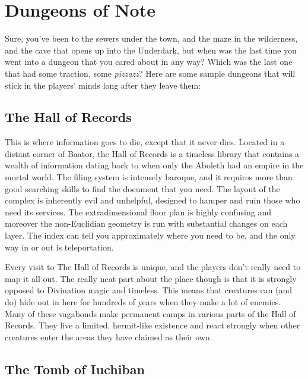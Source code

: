 
\section{Dungeons of Note}

Sure, you've been to the sewers under the town, and the maze in the wilderness, and the cave that opens up into the Underdark, but when was the last time you went into a dungeon that you cared about in any way? Which was the last one that had some traction, some \emph{pizzazz}? Here are some sample dungeons that will stick in the players' minds long after they leave them:

\subsection{The Hall of Records}

This is where information goes to die, except that it never dies. Located in a distant corner of Baator, the Hall of Records is a timeless library that contains a wealth of information dating back to when only the Aboleth had an empire in the mortal world. The filing system is intensely baroque, and it requires more than good searching skills to find the document that you need. The layout of the complex is inherently evil and unhelpful, designed to hamper and ruin those who need its services. The extradimensional floor plan is highly confusing and moreover the non-Euclidian geometry is run with substantial changes on each layer. The index can tell you approximately where you need to be, and the only way in or out is teleportation.

Every visit to The Hall of Records is unique, and the players don't really need to map it all out. The really neat part about the place though is that it is strongly opposed to Divination magic and timeless. This means that creatures can (and do) hide out in here for hundreds of years when they make a lot of enemies. Many of these vagabonds make permanent camps in various parts of the Hall of Records. They live a limited, hermit-like existence and react strongly when other creatures enter the areas they have claimed as their own.

\subsection{The Tomb of Iuchiban}

